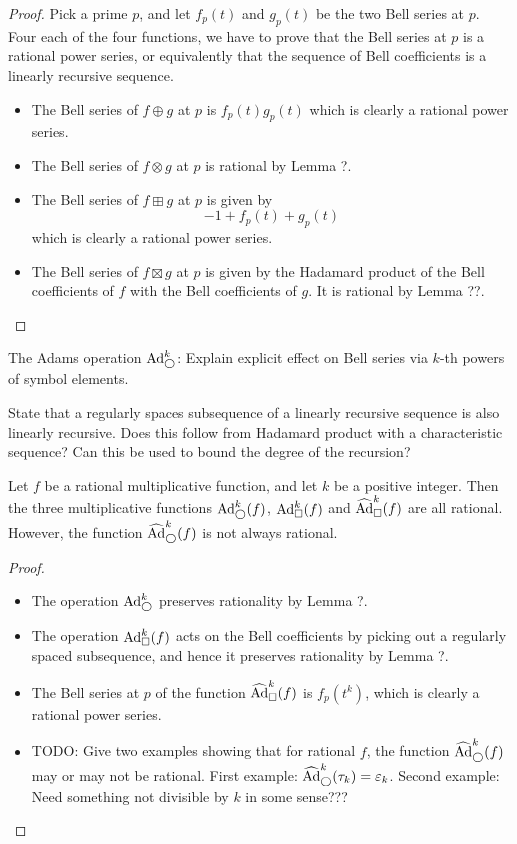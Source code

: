 \begin{proof}
Pick a prime $p$, and let $f_p(t)$ and $g_p(t)$ be the two Bell series at $p$. Four each of the four functions, we have to prove that the Bell series at $p$ is a rational power series, or equivalently that the sequence of Bell coefficients is a linearly recursive sequence.
\begin{itemize}
\item The Bell series of $f \oplus g$ at $p$ is $f_p(t) g_p(t)$ which is clearly a rational power series.
\item The Bell series of $f \otimes g$ at $p$ is rational by Lemma ?.
\item The Bell series of $f \boxplus g$ at $p$ is given by 
$$  -1 + f_p(t) + g_p(t)    $$
which is clearly a rational power series.
\item The Bell series of $f \boxtimes g$ at $p$ is given by the Hadamard product of the Bell coefficients of $f$ with the Bell coefficients of $g$. It is rational by Lemma ??.
\end{itemize}
\end{proof}

\begin{lemma}
The Adams operation $\text{Ad}^{k}_{\bigcirc}$: Explain explicit effect on Bell series via $k$-th powers of symbol elements.
\end{lemma}

\begin{lemma}
State that a regularly spaces subsequence of a linearly recursive sequence is also linearly recursive. Does this follow from Hadamard product with a characteristic sequence? Can this be used to bound the degree of the recursion?
\end{lemma}

\begin{theorem}
Let $f$ be a rational multiplicative function, and let $k$ be a positive integer. Then the three multiplicative functions $\text{Ad}^{k}_{\bigcirc}(f)$, $\text{Ad}^{k}_{\square}(f)$ and $\widehat{\text{Ad}}^{k}_{\square}(f)$ are all rational. However, the function $\widehat{\text{Ad}}^{k}_{\bigcirc}(f)$ is not always rational.
\end{theorem}

\begin{proof}
\begin{itemize}
\item The operation $\text{Ad}^{k}_{\bigcirc}$ preserves rationality by Lemma ?.
\item The operation $\text{Ad}^{k}_{\square}(f)$ acts on the Bell coefficients by picking out a regularly spaced subsequence, and hence it preserves rationality by Lemma ?. 
\item The Bell series at $p$ of the function $\widehat{\text{Ad}}^{k}_{\square}(f)$ is $f_p(t^k)$, which is clearly a rational power series. 
\item TODO: Give two examples showing that for rational $f$, the function $\widehat{\text{Ad}}^{k}_{\bigcirc}(f)$ may or may not be rational. First example: $\widehat{\text{Ad}}^{k}_{\bigcirc}(\tau_k) = \varepsilon_k$. Second example: Need something not divisible by $k$ in some sense???
\end{itemize}
\end{proof}



